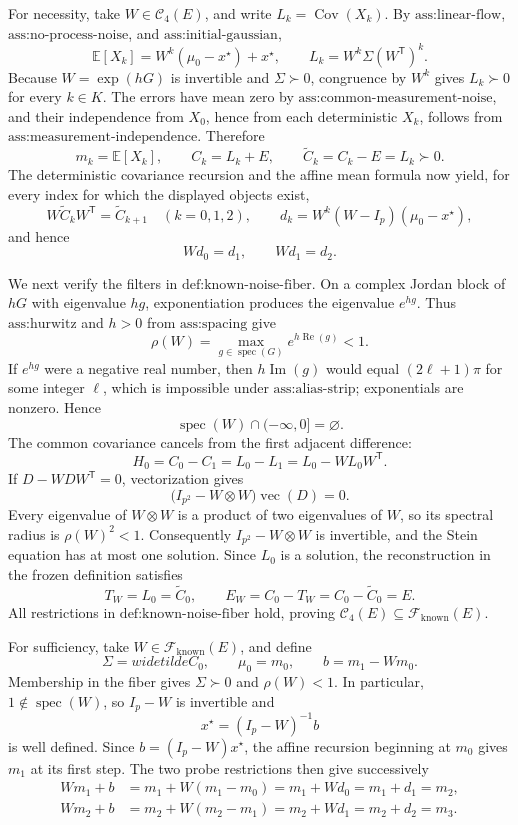 For necessity, take \(W\in\mathcal C_4(E)\), and write \(L_k=\operatorname{Cov}(X_k)\).  By \(\text{ass:linear-flow}\), \(\text{ass:no-process-noise}\), and \(\text{ass:initial-gaussian}\),
\[
 \mathbb E[X_k]=W^k(\mu_0-x^\star)+x^\star,
 \qquad
 L_k=W^k\Sigma(W^{\mathsf T})^k.
\]
Because \(W=\exp(hG)\) is invertible and \(\Sigma\succ0\), congruence by \(W^k\) gives \(L_k\succ0\) for every \(k\in K\).  The errors have mean zero by \(\text{ass:common-measurement-noise}\), and their independence from \(X_0\), hence from each deterministic \(X_k\), follows from \(\text{ass:measurement-independence}\).  Therefore
\[
 m_k=\mathbb E[X_k],
 \qquad
 C_k=L_k+E,
 \qquad
 \widetilde C_k=C_k-E=L_k\succ0.
\]
The deterministic covariance recursion and the affine mean formula now yield, for every index for which the displayed objects exist,
\[
 W\widetilde C_kW^{\mathsf T}=\widetilde C_{k+1}\quad(k=0,1,2),
 \qquad
 d_k=W^k(W-I_p)(\mu_0-x^\star),
\]
and hence
\[
 Wd_0=d_1,
 \qquad
 Wd_1=d_2.
\]

We next verify the filters in \(\text{def:known-noise-fiber}\).  On a complex Jordan block of \(hG\) with eigenvalue \(hg\), exponentiation produces the eigenvalue \(e^{hg}\).  Thus \(\text{ass:hurwitz}\) and \(h>0\) from \(\text{ass:spacing}\) give
\[
 \rho(W)=\max_{g\in\operatorname{spec}(G)}e^{h\operatorname{Re}(g)}<1.
\]
If \(e^{hg}\) were a negative real number, then \(h\operatorname{Im}(g)\) would equal \((2\ell+1)\pi\) for some integer \(\ell\), which is impossible under \(\text{ass:alias-strip}\); exponentials are nonzero.  Hence
\[
 \operatorname{spec}(W)\cap(-\infty,0]=\varnothing.
\]
The common covariance cancels from the first adjacent difference:
\[
 H_0=C_0-C_1=L_0-L_1=L_0-WL_0W^{\mathsf T}.
\]
If \(D-WDW^{\mathsf T}=0\), vectorization gives
\[
 \bigl(I_{p^2}-W\otimes W\bigr)\operatorname{vec}(D)=0.
\]
Every eigenvalue of \(W\otimes W\) is a product of two eigenvalues of \(W\), so its spectral radius is \(\rho(W)^2<1\).  Consequently \(I_{p^2}-W\otimes W\) is invertible, and the Stein equation has at most one solution.  Since \(L_0\) is a solution, the reconstruction in the frozen definition satisfies
\[
 T_W=L_0=\widetilde C_0,
 \qquad
 E_W=C_0-T_W=C_0-\widetilde C_0=E.
\]
All restrictions in \(\text{def:known-noise-fiber}\) hold, proving \(\mathcal C_4(E)\subseteq\mathcal F_{\mathrm{known}}(E)\).

For sufficiency, take \(W\in\mathcal F_{\mathrm{known}}(E)\), and define
\[
 \Sigma=widetilde C_0,
 \qquad
 \mu_0=m_0,
 \qquad
 b=m_1-Wm_0.
\]
Membership in the fiber gives \(\Sigma\succ0\) and \(\rho(W)<1\).  In particular, \(1\notin\operatorname{spec}(W)\), so \(I_p-W\) is invertible and
\[
 x^\star=(I_p-W)^{-1}b
\]
is well defined.  Since \(b=(I_p-W)x^\star\), the affine recursion beginning at \(m_0\) gives \(m_1\) at its first step.  The two probe restrictions then give successively
\[
 \begin{aligned}
 Wm_1+b
 &=m_1+W(m_1-m_0)
 =m_1+Wd_0
 =m_1+d_1=m_2,\\
 Wm_2+b
 &=m_2+W(m_2-m_1)
 =m_2+Wd_1
 =m_2+d_2=m_3.
 \end{aligned}
\]

